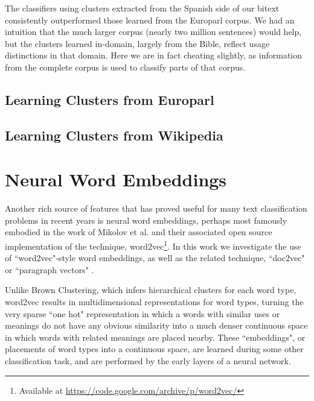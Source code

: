 The classifiers using clusters extracted from the Spanish side of our bitext
consistently outperformed those learned from the Europarl corpus. We had an
intuition that the much larger corpus (nearly two million sentences) would
help, but the clusters learned in-domain, largely from the Bible, reflect
usage distinctions in that domain. Here we are in fact cheating slightly, as
information from the complete corpus is used to classify parts of that corpus.


\subsection{Learning Clusters from Europarl}

\subsection{Learning Clusters from Wikipedia}


\section{Neural Word Embeddings}



Another rich source of features that has proved useful for many text
classification problems in recent years is neural word embeddings, perhaps most
famously embodied in the work of Mikolov et al. \cite{mikolovword2vec} and
their associated open source implementation of the technique,
word2vec\footnote{Available at
\url{https://code.google.com/archive/p/word2vec/}}. In this work we investigate
the use of ``word2vec"-style word embeddings, as well as the related technique,
``doc2vec" or ``paragraph vectors"
\cite{dai-document-embedding-2015,quocle-distributed-representations-2014}.

Unlike Brown Clustering, which infers hierarchical clusters for each word type,
word2vec results in multidimensional representations for word types, turning
the very sparse ``one hot" representation in which a words with similar uses or
meanings do not have any obvious similarity into a much denser continuous space
in which words with related meanings are placed nearby. These ``embeddings", or
placements of word types into a continuous space, are learned during some other
classification task, and are performed by the early layers of a neural network.

